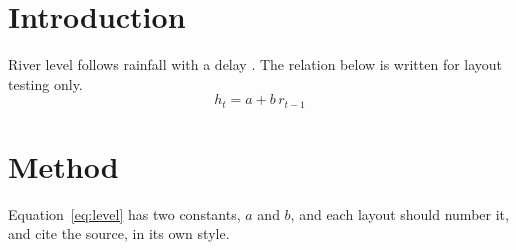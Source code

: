 \section{Introduction}
River level follows rainfall with a delay \citep{knuth1984}. The relation below is written for layout testing only.
\begin{equation}
h_t = a + b\, r_{t-1}
\label{eq:level}
\end{equation}
\section{Method}
Equation~\ref{eq:level} has two constants, $a$ and $b$, and each layout should number it, and cite the source, in its own style.
